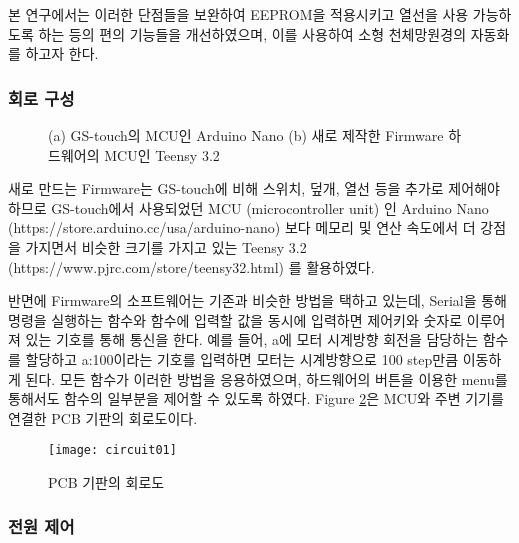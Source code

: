 본 연구에서는 이러한 단점들을 보완하여 EEPROM을 적용시키고 열선을 사용 가능하도록 하는 등의 편의 기능들을 개선하였으며, 이를 사용하여 소형 천체망원경의 자동화를 하고자 한다.

\subsubsection{회로 구성}

\begin{figure}[ht]
	\begin{center}
	\end{center}
\caption{(a) GS-touch의 MCU인 Arduino Nano (b) 새로 제작한 Firmware 하드웨어의 MCU인 Teensy 3.2}
\label{mcu}
\end{figure}

새로 만드는 Firmware는 GS-touch에 비해 스위치, 덮개, 열선 등을 추가로 제어해야 하므로 GS-touch에서 사용되었던 MCU (microcontroller unit) 인 Arduino Nano (https://store.arduino.cc/usa/arduino-nano) 보다 메모리 및 연산 속도에서 더 강점을 가지면서 비슷한 크기를 가지고 있는 Teensy 3.2 (https://www.pjrc.com/store/teensy32.html) 를 활용하였다. 

반면에 Firmware의 소프트웨어는 기존과 비슷한 방법을 택하고 있는데, Serial을 통해 명령을 실행하는 함수와 함수에 입력할 값을 동시에 입력하면 제어키와 숫자로 이루어져 있는 기호를 통해 통신을 한다. 예를 들어, a에 모터 시계방향 회전을 담당하는 함수를 할당하고 a:100이라는 기호를 입력하면 모터는 시계방향으로 100 step만큼 이동하게 된다. 모든 함수가 이러한 방법을 응용하였으며, 하드웨어의 버튼을 이용한 menu를 통해서도 함수의 일부분을 제어할 수 있도록 하였다. \textrm{Figure} \ref{circuit01}은 MCU와 주변 기기를 연결한 PCB 기판의 회로도이다.

\begin{figure}[h]
	\begin{center}
		\texttt{[image: circuit01]}
	\end{center}
	\caption{PCB 기판의 회로도}
	\label{circuit01}
\end{figure}

\subsubsection{전원 제어}

